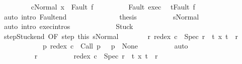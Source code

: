 \begin{isabellebody}
\ \ \ \ \ \ \isamarkupfalse%
\ {\isachardoublequoteopen}{\isasymGamma}{\isasymturnstile}\ {\isasymlangle}cNormal\ x{\isasymrangle}\ {\isasymRightarrow}\ Fault\ f{\isachardoublequoteclose}\isacommand{{\isachardot}}\isamarkupfalse%
\isanewline
\ \ \ \ \ \ \isamarkupfalse%
\ \isamarkupfalse%
\ Fault\ exec{\isacharprime}\ \isamarkupfalse%
\ {\isachardoublequoteopen}t{\isacharequal}Fault\ f{\isachardoublequoteclose}\isanewline
\ \ \ \ \ \ \ \ \isamarkupfalse%
\ {\isacharparenleft}auto\ intro{\isacharcolon}\ Fault{\isacharunderscore}end{\isacharparenright}\isanewline
\ \ \ \ \ \ \isamarkupfalse%
\isanewline
\ \ \ \ \ \ \isamarkupfalse%
\ {\isacharquery}thesis\isanewline
\ \ \ \ \ \ \ \ \isamarkupfalse%
\ s{\isacharunderscore}Normal\isanewline
\ \ \ \ \ \ \ \ \isamarkupfalse%
\ {\isacharparenleft}auto\ intro{\isacharcolon}\ exec{\isachardot}intros{\isacharparenright}\isanewline
\ \ \ \ \isamarkupfalse%
\isanewline
\ \ \ \ \ \ \isamarkupfalse%
\ Stuck\isanewline
\ \ \ \ \ \ \isamarkupfalse%
\ step{\isacharunderscore}Stuck{\isacharunderscore}end\ {\isacharbrackleft}OF\ step\ this{\isacharbrackright}\ s{\isacharunderscore}Normal\isanewline
\ \ \ \ \ \ \isamarkupfalse%
\ {\isachardoublequoteopen}{\isacharparenleft}{\isasymexists}r{\isachardot}\ redex\ c\ {\isacharequal}\ Spec\ r\ {\isasymand}\ {\isacharparenleft}{\isasymforall}t{\isachardot}\ {\isacharparenleft}x{\isacharcomma}\ t{\isacharparenright}\ {\isasymnotin}\ r{\isacharparenright}{\isacharparenright}\ {\isasymor}\isanewline
\ \ \ \ \ \ \ \ \ \ \ \ {\isacharparenleft}{\isasymexists}p{\isachardot}\ redex\ c\ {\isacharequal}\ Call\ p\ {\isasymand}\ {\isasymGamma}\ p\ {\isacharequal}\ None{\isacharparenright}{\isachardoublequoteclose}\isanewline
\ \ \ \ \ \ \ \ \isamarkupfalse%
\ auto\isanewline
\ \ \ \ \ \ \isamarkupfalse%
\isanewline
\ \ \ \ \ \ \isacommand{{\isacharbraceleft}}\isamarkupfalse%
\isanewline
\ \ \ \ \ \ \ \ \isamarkupfalse%
\ r\isanewline
\ \ \ \ \ \ \ \ \isamarkupfalse%
\ {\isachardoublequoteopen}redex\ c\ {\isacharequal}\ Spec\ r{\isachardoublequoteclose}\ \ {\isachardoublequoteopen}{\isacharparenleft}{\isasymforall}t{\isachardot}\ {\isacharparenleft}x{\isacharcomma}\ t{\isacharparenright}\ {\isasymnotin}\ r{\isacharparenright}{\isachardoublequoteclose}\isanewline

\end{isabellebody}
